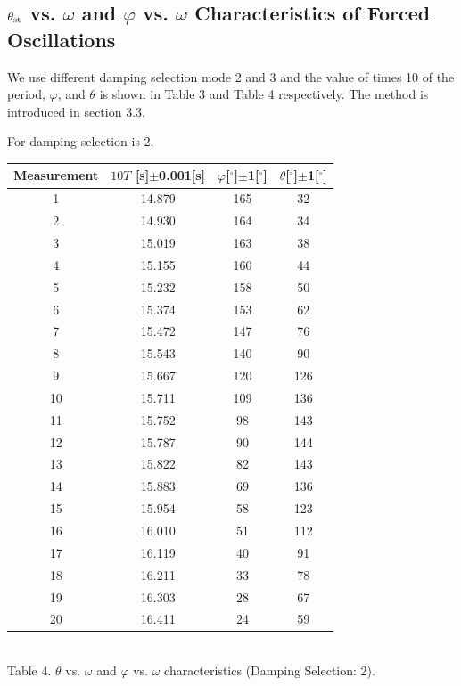 \documentclass[a4paper]{report}
\begin{document}
	\subsection{$\theta_{\rm{st}}$ vs. $\omega$ and $\varphi$ vs. $\omega$ Characteristics of Forced Oscillations}
	We use different damping selection mode 2 and 3 and the value of times 10 of the period, $\varphi$, and $\theta$ is shown in Table 3 and Table 4 respectively. The method is introduced in section 3.3.
	
	For damping selection is 2,
	
	\begin{center}
	\begin{tabular}{|c|c|c|c|}
		\hline
		Measurement&$10T$ [s]$\pm$0.001[s]&$\varphi$[$^\circ$]$\pm$1[$^\circ$]&$\theta$[$^\circ$]$\pm$1[$^\circ$]\\
		\hline
		1&14.879&165&32\\
		\hline
		2&14.930&164&34\\
		\hline
		3&15.019&163&38\\
		\hline
		4&15.155&160&44\\
		\hline
		5&15.232&158&50\\
		\hline
		6&15.374&153&62\\
		\hline
		7&15.472&147&76\\
		\hline
		8&15.543&140&90\\
		\hline
		9&15.667&120&126\\
		\hline
		10&15.711&109&136\\
		\hline
		11&15.752&98&143\\
		\hline
		12&15.787&90&144\\
		\hline
		13&15.822&82&143\\
		\hline
		14&15.883&69&136\\
		\hline
		15&15.954&58&123\\
		\hline
		16&16.010&51&112\\
		\hline
		17&16.119&40&91\\
		\hline
		18&16.211&33&78\\
		\hline
		19&16.303&28&67\\
		\hline
		20&16.411&24&59\\
		\hline
	\end{tabular}
		\vspace{0.5cm}
		\\Table 4. $\theta$ vs. $\omega$ and $\varphi$ vs. $\omega$ characteristics (Damping Selection: 2).
	\end{center}
	
\end{document}

